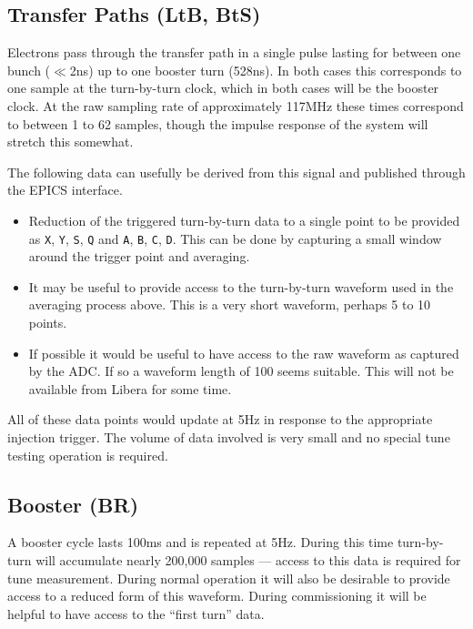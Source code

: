 \documentclass[
    a4paper,
    fleqn
]{article}
\newcommand{\id}[1]{\texttt{#1}}
\newcommand{\XY}{\id{X}, \id{Y}}
\newcommand{\SQ}{\id{S}, \id{Q}}
\newcommand{\XYSQ}{\XY, \SQ}
\newcommand{\ABCD}{\id{A}, \id{B}, \id{C}, \id{D}}
\begin{document}
\subsection{Transfer Paths (LtB, BtS)}

Electrons pass through the transfer path in a single pulse lasting for
between one bunch ($\ll$2ns) up to one booster turn (528ns).  In both
cases this corresponds to one sample at the turn-by-turn clock, which
in both cases will be the booster clock.  At the raw sampling rate of
approximately 117MHz these times correspond to between 1 to 62
samples, though the impulse response of the system will stretch this
somewhat.

The following data can usefully be derived from this signal and
published through the EPICS interface.
\begin{itemize}
\item
  Reduction of the triggered turn-by-turn data to a single point to be
  provided as \XYSQ{} and \ABCD.  This can be done by capturing a
  small window around the trigger point and averaging.
\item
  It may be useful to provide access to the turn-by-turn waveform used
  in the averaging process above.  This is a very short waveform,
  perhaps 5 to 10 points.
\item
  If possible it would be useful to have access to the raw waveform as
  captured by the ADC.  If so a waveform length of 100 seems suitable.
  This will not be available from Libera for some time.
\end{itemize}
All of these data points would update at 5Hz in response to the
appropriate injection trigger.  The volume of data involved is very
small and no special tune testing operation is required.


\subsection{Booster (BR)}

A booster cycle lasts 100ms and is repeated at 5Hz.  During this time
turn-by-turn will accumulate nearly 200,000 samples --- access to this
data is required for tune measurement.  During normal operation it
will also be desirable to provide access to a reduced form of this
waveform.  During commissioning it will be helpful to have access to
the ``first turn'' data.
\end{document}
